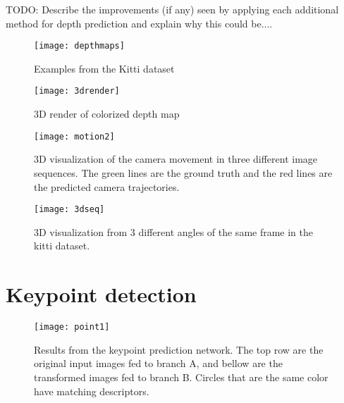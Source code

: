 TODO: Describe the improvements (if any) seen by applying each additional method for depth prediction and explain why this could be....

\iffalse
\begin{figure}[H]
	\centering
	\texttt{[image: evaluation]}
	\caption{Evaluation metrics when testing the configurations on the testing split of the datasets}
	\label{fig:evaluation}
\end{figure}
\fi

\clearpage

\begin{figure}[H]
	\centering
	\texttt{[image: depthmaps]}
	\caption{Examples from the Kitti dataset}
	\label{fig:depthmapskitty}
\end{figure}


\begin{figure}[H]
	\centering
	\texttt{[image: 3drender]}
	\caption{3D render of colorized depth map}
	\label{fig:3drender}
\end{figure}

\begin{figure}[H]
	\centering
	\texttt{[image: motion2]}
	\caption{3D visualization of the camera movement in three different image sequences. The green lines are the ground truth and the red lines are the predicted camera trajectories.}
	\label{fig:movement}
\end{figure}

\begin{figure}[H]
	\centering
	\texttt{[image: 3dseq]}
	\caption{3D visualization from 3 different angles of the same frame in the kitti dataset.}
	\label{fig:3dseq}
\end{figure}

\section{Keypoint detection}

\begin{figure}[H]
	\centering
	\texttt{[image: point1]}
	\caption{Results from the keypoint prediction network. The top row are the original input images fed to branch A, and bellow are the transformed images fed to branch B. Circles that are the same color have matching descriptors.}
	\label{fig:point1}
\end{figure}

